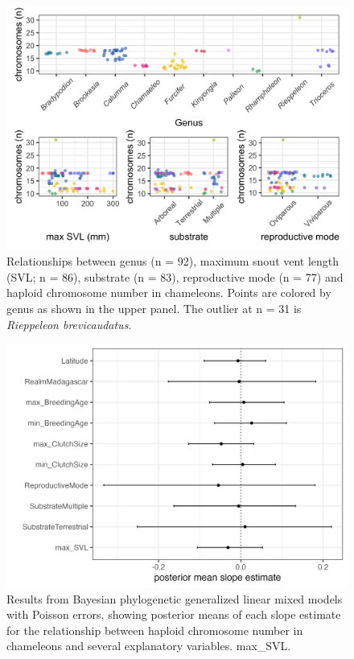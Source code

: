 \documentclass[a4paper, 12pt]{article}
\begin{document}


\begin{figure}[H]
 \centering
  \includegraphics[width = \linewidth]{figures/ecology-genus-svl.png}
  \caption{Relationships between genus (n = 92), maximum snout vent length (SVL; n = 86), substrate (n = 83), reproductive mode (n = 77) and haploid chromosome number in chameleons. Points are colored by genus as shown in the upper panel. The outlier at n = 31 is \textit{Rieppeleon brevicaudatus}.
}
  \label{fig-ecology1}
\end{figure} 

\newpage
\begin{figure}[H]
 \centering
  \includegraphics[width = \linewidth]{figures/mcmcglmm-figure.png}
  \caption{Results from Bayesian phylogenetic generalized linear mixed models with Poisson errors, showing posterior means of each slope estimate for the relationship between haploid chromosome number in chameleons and several explanatory variables. max\_SVL.
}
  \label{fig-ecology2}
\end{figure}
\end{document}
